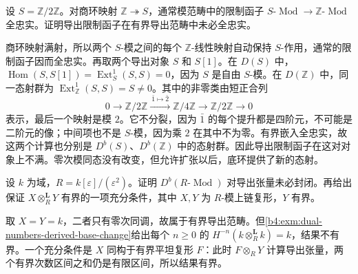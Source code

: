 \begin{exercise}\label{b4:ex:18-restriction-not-full}
	设 \(S=\mathbb Z/2\mathbb Z\)。对商环映射 \(\mathbb Z\twoheadrightarrow S\)，通常模范畴中的限制函子 \(S\text{-}\operatorname{Mod}\to\mathbb Z\text{-}\operatorname{Mod}\) 全忠实。证明导出限制函子在有界导出范畴中未必全忠实。
\end{exercise}
\begin{solution}
	商环映射满射，所以两个 \(S\)-模之间的每个 \(\mathbb Z\)-线性映射自动保持 \(S\)-作用，通常的限制函子因而全忠实。再取两个导出对象 \(S\) 和 \(S[1]\)。在 \(D(S)\) 中，\(\operatorname{Hom}(S,S[1])=\operatorname{Ext}_S^1(S,S)=0\)，因为 \(S\) 是自由 \(S\)-模。在 \(D(\mathbb Z)\) 中，同一态射群为 \(\operatorname{Ext}_{\mathbb Z}^1(S,S)=S\ne0\)。其中的非零类由短正合列
	\[
		0\longrightarrow\mathbb Z/2\mathbb Z \xrightarrow{\ \bar1\mapsto\bar2\ }\mathbb Z/4\mathbb Z \longrightarrow\mathbb Z/2\mathbb Z\longrightarrow0
	\]
	表示，最后一个映射是模 \(2\)。它不分裂，因为 \(\bar1\) 的每个提升都是四阶元，不可能是二阶元的像；中间项也不是 \(S\)-模，因为乘 \(2\) 在其中不为零。有界嵌入全忠实，故这两个计算也分别是 \(D^b(S)\)、\(D^b(\mathbb Z)\) 中的态射群。因此导出限制函子在这对对象上不满。零次模同态没有改变，但允许扩张以后，底环提供了新的态射。
\end{solution}

\begin{exercise}\label{b4:ex:18-bounded-not-tensor-closed}
	设 \(k\) 为域，\(R=k[\varepsilon]/(\varepsilon^2)\)。证明 \(D^b(R\text{-}\operatorname{Mod})\) 对导出张量未必封闭。再给出保证 \(X\otimes_R^{\mathbf L}Y\) 有界的一项充分条件，其中 \(X,Y\) 为 \(R\)-模上链复形，\(Y\) 有界。
\end{exercise}
\begin{solution}
	取 \(X=Y=k\)，二者只有零次同调，故属于有界导出范畴。但\cref{b4:exm:dual-numbers-derived-base-change}给出每个 \(n\ge0\) 的 \(H^{-n}(k\otimes_R^{\mathbf L}k)=k\)，结果不有界。一个充分条件是 \(X\) 同构于有界平坦复形 \(F\)：此时 \(F\otimes_RY\) 计算导出张量，两个有界次数区间之和仍是有限区间，所以结果有界。
\end{solution}

